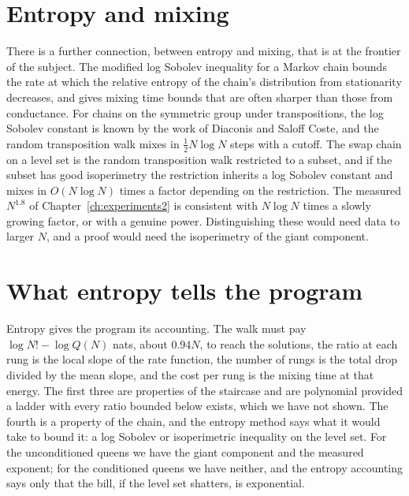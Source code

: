 \section{Entropy and mixing}

There is a further connection, between entropy and mixing, that is at the frontier of the subject. The modified log Sobolev inequality for a Markov chain bounds the rate at which the relative entropy of the chain's distribution from stationarity decreases, and gives mixing time bounds that are often sharper than those from conductance. For chains on the symmetric group under transpositions, the log Sobolev constant is known by the work of Diaconis and Saloff Coste, and the random transposition walk mixes in $\tfrac12 N \log N$ steps with a cutoff. The swap chain on a level set is the random transposition walk restricted to a subset, and if the subset has good isoperimetry the restriction inherits a log Sobolev constant and mixes in $O(N \log N)$ times a factor depending on the restriction. The measured $N^{1.8}$ of Chapter~\ref{ch:experiments2} is consistent with $N \log N$ times a slowly growing factor, or with a genuine power. Distinguishing these would need data to larger $N$, and a proof would need the isoperimetry of the giant component.

\section{What entropy tells the program}

Entropy gives the program its accounting. The walk must pay $\log N! - \log Q(N)$ nats, about $0.94 N$, to reach the solutions, the ratio at each rung is the local slope of the rate function, the number of rungs is the total drop divided by the mean slope, and the cost per rung is the mixing time at that energy. The first three are properties of the staircase and are polynomial provided a ladder with every ratio bounded below exists, which we have not shown. The fourth is a property of the chain, and the entropy method says what it would take to bound it: a log Sobolev or isoperimetric inequality on the level set. For the unconditioned queens we have the giant component and the measured exponent; for the conditioned queens we have neither, and the entropy accounting says only that the bill, if the level set shatters, is exponential.
